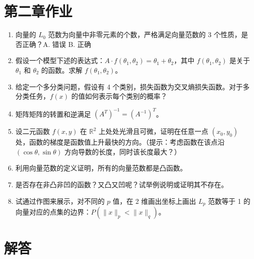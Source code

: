 \documentclass[a4paper,12pt]{book}
\begin{document}
\section*{第二章作业}

\begin{enumerate}
    \item 向量的 $L_0$ 范数为向量中非零元素的个数，严格满足向量范数的 3 个性质，是否正确？A. 错误 B. 正确
    \item 假设一个模型下述的表达式：$A \cdot f(\theta_1, \theta_2) = \theta_1 + \theta_2$，其中 $f(\theta_1, \theta_2)$ 是关于 $\theta_1$ 和 $\theta_2$ 的函数。求解 $f(\theta_1, \theta_2)$。
    \item 给定一个多分类问题，假设有 4 个类别，损失函数为交叉熵损失函数。对于多分类任务，$f(x)$ 的值如何表示每个类别的概率？
    \item 矩阵矩阵的转置和逆满足 $(A^T)^{-1} = (A^{-1})^T$。
    \item 设二元函数 $f(x, y)$ 在 $\mathbb{R}^2$ 上处处光滑且可微，证明在任意一点 $(x_0, y_0)$ 处，函数的梯度是函数值上升最快的方向。（提示：考虑函数在该点沿 $(\cos \theta, \sin \theta)$ 方向导数的长度，同时该长度最大？）
    \item 利用向量范数的定义证明，所有的向量范数都是凸函数。
    \item 是否存在非凸非凹的函数？又凸又凹呢？试举例说明或证明其不存在。
    \item 试通过作图来展示，对不同的 $p$ 值，在 2 维画出坐标上画出 $L_p$ 范数等于 1 的向量对应的点集的边界：$P(\|x\|_p < \|x\|_q)$。
\end{enumerate}

\section*{解答}
\end{document}
